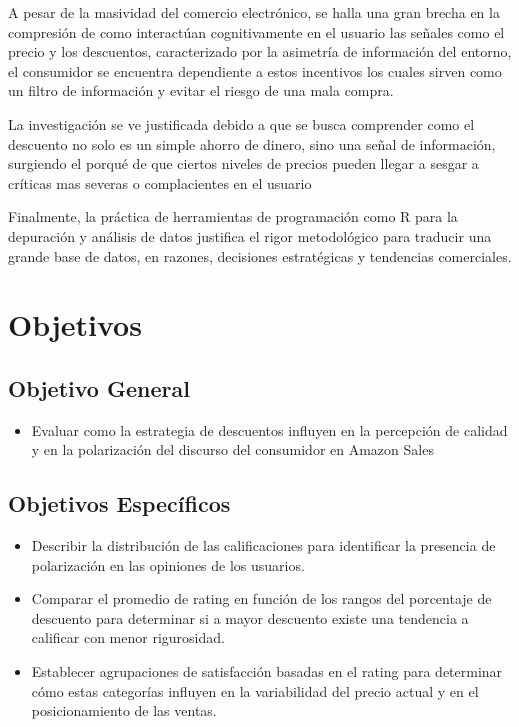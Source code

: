 \documentclass[oneside,11pt]{Latex/Classes/PhDthesisPSnPDF}
\begin{document}
A pesar de la masividad del comercio electrónico, se halla una gran
brecha en la compresión de como interactúan cognitivamente en el usuario
las señales como el precio y los descuentos, caracterizado por la
asimetría de información del entorno, el consumidor se encuentra
dependiente a estos incentivos los cuales sirven como un filtro de
información y evitar el riesgo de una mala compra.

La investigación se ve justificada debido a que se busca comprender como
el descuento no solo es un simple ahorro de dinero, sino una señal de
información, surgiendo el porqué de que ciertos niveles de precios
pueden llegar a sesgar a críticas mas severas o complacientes en el
usuario

Finalmente, la práctica de herramientas de programación como R para la
depuración y análisis de datos justifica el rigor metodológico para
traducir una grande base de datos, en razones, decisiones estratégicas y
tendencias comerciales.\\

\section{Objetivos}

\subsection{Objetivo General}
\begin{itemize}
  \item{Evaluar como la estrategia de descuentos influyen en la percepción de calidad y en la polarización del discurso del consumidor en Amazon Sales}
\end{itemize}

\subsection{Objetivos Específicos}
\begin{itemize}
  \item{Describir la distribución de las calificaciones para identificar la presencia de polarización en las opiniones de los usuarios.}
  \item{Comparar el promedio de rating en función de los rangos del porcentaje de descuento para determinar si a mayor descuento existe una tendencia a calificar con menor rigurosidad.}
   \item{Establecer agrupaciones de satisfacción basadas en el rating para determinar cómo estas categorías influyen en la variabilidad del precio actual y en el posicionamiento de las ventas.}

\end{itemize}
\end{document}
